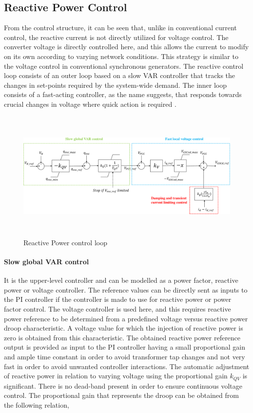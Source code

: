 \subsection{Reactive Power Control}
From the control structure, it can be seen that, unlike in conventional current control, the reactive current is not directly utilized for voltage control. The converter voltage is directly controlled here, and this allows the current to modify on its own according to varying network conditions. This strategy is similar to the voltage control in conventional synchronous generators. The reactive control loop consists of an outer loop based on a slow VAR controller that tracks the changes in set-points required by the system-wide demand. The inner loop consists of a fast-acting controller, as the name suggests, that responds towards crucial changes in voltage where quick action is required \cite{korai_dynamic_2019}.

\begin{figure}[H]
\centering
    \includegraphics[height = 6.5cm,width = \textwidth]{Diagrams/Chapter_3/Reactive_power_loop.pdf}
    \caption{Reactive Power control loop \cite{korai_dynamic_2019}}
    \label{fig:Reactive_Power_Control_Loop}
\end{figure}

\paragraph{Slow global VAR control}
It is the upper-level controller and can be modelled as a power factor, reactive power or voltage controller. The reference values can be directly sent as inputs to the \gls{PI} controller if the controller is made to use for reactive power or power factor control. The voltage controller is used here, and this requires reactive power reference to be determined from a predefined voltage versus reactive power droop characteristic. A voltage value for which the injection of reactive power is zero is obtained from this characteristic. The obtained reactive power reference output is provided as input to the \gls{PI} controller having a small proportional gain and ample time constant in order to avoid transformer tap changes and not very fast in order to avoid unwanted controller interactions. The automatic adjustment of reactive power in relation to varying voltage using the proportional gain $k_{QV}$ is significant. There is no dead-band present in order to ensure continuous voltage control. The  proportional gain that represents the droop can be obtained from the following relation,

